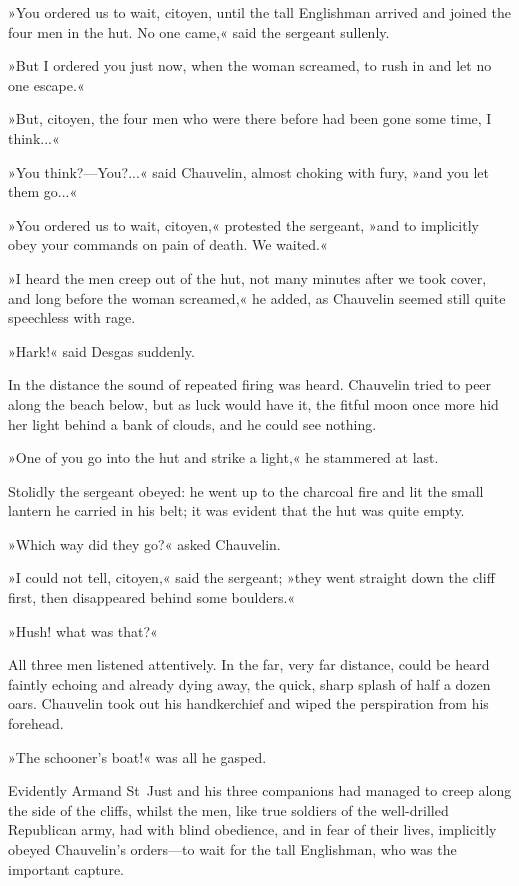 »You ordered us to wait, citoyen, until the tall Englishman arrived and joined the four men in the hut. No one came,« said the sergeant sullenly.

»But I ordered you just now, when the woman screamed, to rush in and let no one escape.«

»But, citoyen, the four men who were there before had been gone some time, I think...«

»You think?\allowbreak---\allowbreak You?...« said Chauvelin, almost choking with fury, »and you let them go...«

»You ordered us to wait, citoyen,« protested the sergeant, »and to implicitly obey your commands on pain of death. We waited.«

»I heard the men creep out of the hut, not many minutes after we took cover, and long before the woman screamed,« he added, as Chauvelin seemed still quite speechless with rage.

»Hark!« said Desgas suddenly.

In the distance the sound of repeated firing was heard. Chauvelin tried to peer along the beach below, but as luck would have it, the fitful moon once more hid her light behind a bank of clouds, and he could see nothing.

»One of you go into the hut and strike a light,« he stammered at last.

Stolidly the sergeant obeyed: he went up to the charcoal fire and lit the small lantern he carried in his belt; it was evident that the hut was quite empty.

»Which way did they go?« asked Chauvelin.

»I could not tell, citoyen,« said the sergeant; »they went straight down the cliff first, then disappeared behind some boulders.«

»Hush! what was that?«

All three men listened attentively. In the far, very far distance, could be heard faintly echoing and already dying away, the quick, sharp splash of half a dozen oars. Chauvelin took out his handkerchief and wiped the perspiration from his forehead.

»The schooner's boat!« was all he gasped.

Evidently Armand St~Just and his three companions had managed to creep along the side of the cliffs, whilst the men, like true soldiers of the well-drilled Republican army, had with blind obedience, and in fear of their lives, implicitly obeyed Chauvelin's orders\allowbreak---\allowbreak to wait for the tall Englishman, who was the important capture.

